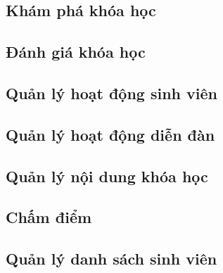 \documentclass[./../main_file.tex]{subfiles}
\begin{document}
	\subsection{Khám phá khóa học }
	\begin{figure}[H]
	\centering
	\resizebox{1.0\textwidth}{!}{}
	\end{figure}
	
	\subsection{Đánh giá khóa học}
	\begin{figure}[H]
		\centering
		\resizebox{0.5\textwidth}{!}{}
	\end{figure}
	
	\subsection{Quản lý hoạt động sinh viên }
	\begin{figure}[H]
		\centering
		\resizebox{1.0\textwidth}{!}{}
	\end{figure}
	
	\subsection{Quản lý hoạt động diễn đàn}
	\begin{figure}[H]
		\centering
		\resizebox{1.0\textwidth}{!}{}
	\end{figure}
	
	\subsection{Quản lý nội dung khóa học }
	\begin{figure}[H]
		\centering
		\resizebox{1.0\textwidth}{!}{}
	\end{figure}
	
	\subsection{Chấm điểm}
	
	
	\subsection{Quản lý danh sách sinh viên}
	\begin{figure}[H]
		\centering
		\resizebox{1.0\textwidth}{!}{}
	\end{figure}
	
\end{document}
